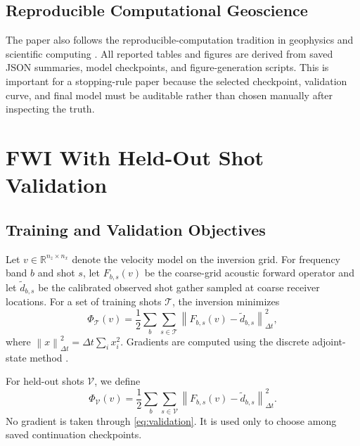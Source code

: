 \documentclass[10pt,twocolumn]{article}
\newcommand{\R}{\mathbb{R}}
\newcommand{\norm}[1]{\left\lVert #1 \right\rVert}
\newcommand{\misfit}{\Phi}
\begin{document}
\subsection{Reproducible Computational Geoscience}
The paper also follows the reproducible-computation tradition in
geophysics and scientific computing
\cite{claerbout1992electronic,schwab2000making,buckheit1995wavelab,
donoho2009reproducible,peng2011reproducible,sandve2013tenrules,
wilson2014best,wilson2017good,stodden2016enhancing,
gil2016geosciencepaper,konkol2019geoscience,piccolo2016tools,
hutton2020bmi}. All reported tables and figures are derived from saved
JSON summaries, model checkpoints, and figure-generation scripts. This is
important for a stopping-rule paper because the selected checkpoint,
validation curve, and final model must be auditable rather than chosen
manually after inspecting the truth.

\section{FWI With Held-Out Shot Validation}
\subsection{Training and Validation Objectives}
Let $v\in\R^{n_z\times n_x}$ denote the velocity model on the inversion
grid. For frequency band $b$ and shot $s$, let $F_{b,s}(v)$ be the
coarse-grid acoustic forward operator and let $\tilde d_{b,s}$ be the
calibrated observed shot gather sampled at coarse receiver locations. For
a set of training shots $\mathcal{T}$, the inversion minimizes
\begin{equation}
  \misfit_{\mathcal{T}}(v)
  = \frac{1}{2}\sum_{b}\sum_{s\in\mathcal{T}}
    \norm{F_{b,s}(v)-\tilde d_{b,s}}_{\Delta t}^{2},
  \label{eq:train}
\end{equation}
where $\norm{x}_{\Delta t}^{2}=\Delta t\sum_i x_i^2$. Gradients are
computed using the discrete adjoint-state method
\cite{plessix2006review,virieux2009overview}.

For held-out shots $\mathcal{V}$, we define
\begin{equation}
  \misfit_{\mathcal{V}}(v)
  = \frac{1}{2}\sum_{b}\sum_{s\in\mathcal{V}}
    \norm{F_{b,s}(v)-\tilde d_{b,s}}_{\Delta t}^{2}.
  \label{eq:validation}
\end{equation}
No gradient is taken through \eqref{eq:validation}. It is used only to
choose among saved continuation checkpoints.
\end{document}
